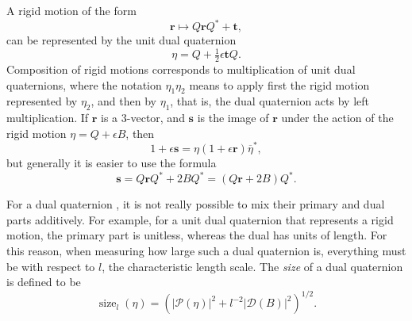 \documentclass[reqno,12pt]{amsart}
\DeclareMathOperator\size{{size}}
\begin{document}
A rigid motion of the form
\begin{equation}
\label{rigid motion action}
\bm r \mapsto Q \bm r Q^* + \bm t,
\end{equation}
can be represented by the unit dual quaternion
\begin{equation}
\label{rigid motion as dual quaternion}
\eta = Q + \tfrac12 \epsilon \bm t Q.
\end{equation}
Composition of rigid motions corresponds to multiplication of unit dual quaternions, where the notation $\eta_1 \eta_2$ means to apply first the rigid motion represented by $\eta_2$, and then by $\eta_1$, that is, the dual quaternion acts by left multiplication.  If $\bm r$ is a 3-vector, and $\bm s$ is the image of $\bm r$ under the action of the rigid motion $\eta = Q + \epsilon B$, then
\begin{equation}
\label{defn of rigid motion on 3-vector}
1 + \epsilon \bm s = \eta (1 + \epsilon \bm r) \overline\eta^* ,
\end{equation}
but generally it is easier to use the formula
\begin{equation}
\label{rigid motion on 3-vector}
\bm s = Q \bm r Q^* + 2 B Q^* = (Q \bm r + 2 B) Q^* .
\end{equation}

For a dual quaternion , it is not really possible to mix their primary and dual parts additively.  For example, for a unit dual quaternion that represents a rigid motion, the primary part is unitless, whereas the dual has units of length.  For this reason, when measuring how large such a dual quaternion is, everything must be with respect to $l$, the characteristic length scale.  The \emph{size} of a dual quaternion is defined to be
\begin{equation}
\label{size}
\size_{l}(\eta) = \left(|\mathcal P(\eta)|^2 + l^{-2}|\mathcal D(B)|^2\right)^{1/2}.
\end{equation}
\end{document}
